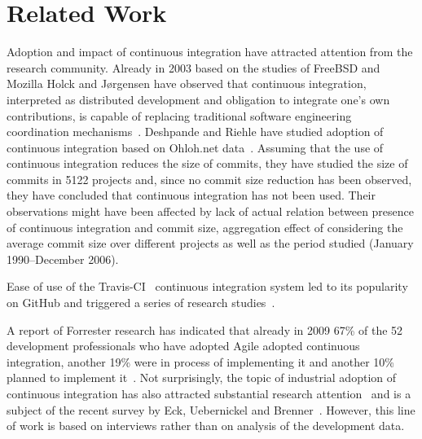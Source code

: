 \section{Related Work}
\label{sec:rw}
Adoption and impact of continuous integration have attracted  attention from the research community. Already in 2003 based on the studies of FreeBSD and Mozilla Holck and J{\o}rgensen have observed that continuous integration, interpreted as distributed development and obligation to integrate one's own contributions, is capable of replacing traditional software engineering coordination mechanisms~\cite{HolckJ03}.  
Deshpande and Riehle have studied adoption of continuous integration based on Ohloh.net data~\cite{Deshpande2008}. Assuming that the use of continuous integration reduces the size of commits, they have studied the size of commits in 5122 projects and, since no commit size reduction has been observed, they have concluded that continuous integration has not been used. Their observations might have been affected by lack of actual relation between presence of continuous integration and commit size, aggregation effect of considering the average commit size over different projects as well as the period studied (January 1990--December 2006). 

Ease of use of the Travis-CI~\cite{TravisCI} continuous integration system led to its popularity on GitHub and triggered a series of research studies~\cite{era14,VasilescuYWDF15,yue2015wait,BellerGZ16,Hilton2016,Yu2016}.

A report of Forrester research has indicated that already in 2009 67\% of the 52 development professionals who have adopted Agile adopted continuous integration, another 19\% were in process of implementing it and another 10\% planned to implement it~\cite{Forrester}. 
Not surprisingly, the topic of industrial adoption of continuous integration 
has also attracted substantial research attention~\cite{Leppanen2015,Laukkanen2015Agile,Debbiche2014,Stahl2014ICSEComp,Stahl2014JSS} and is a subject of the recent survey by Eck, Uebernickel and Brenner~\cite{EckUB14}. 
However, this line of work is based on interviews rather than on analysis of the development data.

